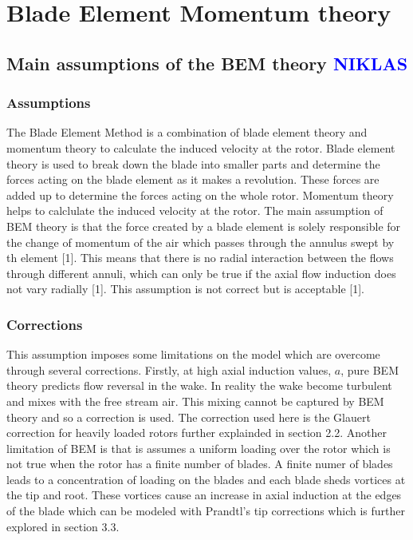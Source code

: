 \chapter{Blade Element Momentum theory}

\section{Main assumptions of the BEM theory \textcolor{blue}{NIKLAS}}
\subsection{Assumptions}
The Blade Element Method is a combination of blade element theory and momentum theory to calculate the induced velocity at the rotor. Blade element theory is used to break down the blade into smaller parts and determine the forces acting on the blade element as it makes a revolution. These forces are added up to determine the forces acting on the whole rotor. Momentum theory helps to calclulate the induced velocity at the rotor. The main assumption of BEM theory is that the force created by a blade element is solely responsible for the change of momentum of the air which passes through the annulus swept by th element [1]. This means that there is no radial interaction between the flows through different annuli, which can only be true if the axial flow induction does not vary radially [1]. This assumption is not correct but is acceptable [1].
\subsection{Corrections}
This assumption imposes some limitations on the model which are overcome through several corrections. Firstly, at high axial induction values, $a$, pure BEM theory predicts flow reversal in the wake. In reality the wake become turbulent and mixes with the free stream air. This mixing cannot be captured by BEM theory and so a correction is used. The correction used here is the Glauert correction for heavily loaded rotors further explainded in section 2.2. Another limitation of BEM is that is assumes a uniform loading over the rotor which is not true when the rotor has a finite number of blades. A finite numer of blades leads to a concentration of loading on the blades and each blade sheds vortices at the tip and root. These vortices cause an increase in axial induction at the edges of the blade which can be modeled with Prandtl's tip corrections which is further explored in section 3.3.

